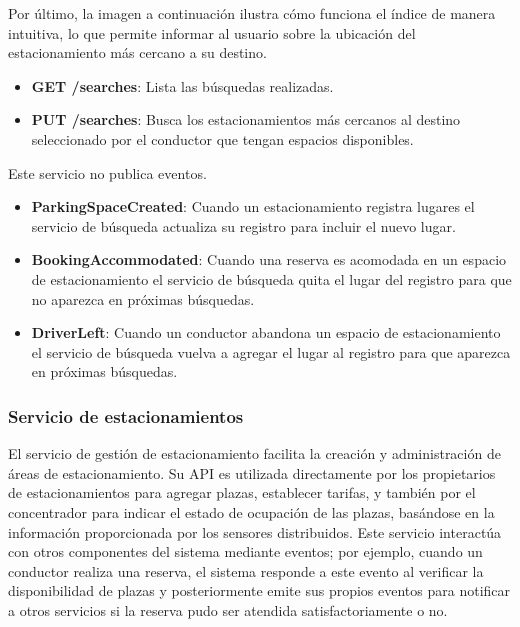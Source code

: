 
Por último, la imagen a continuación ilustra cómo funciona el índice de manera intuitiva, lo que permite informar al usuario sobre la ubicación del estacionamiento más cercano a su destino.


\begin{itemize}
    \item \textbf{GET /searches}: Lista las búsquedas realizadas.
    \item \textbf{PUT /searches}: Busca los estacionamientos más cercanos al destino seleccionado por el conductor que tengan espacios disponibles.
\end{itemize}

Este servicio no publica eventos.

\begin{itemize}
    \item \textbf{ParkingSpaceCreated}: Cuando un estacionamiento registra lugares el servicio de búsqueda actualiza su registro para incluir el nuevo lugar.
    \item \textbf{BookingAccommodated}: Cuando una reserva es acomodada en un espacio de estacionamiento el servicio de búsqueda quita el lugar del registro para que no aparezca en próximas búsquedas.
    \item \textbf{DriverLeft}: Cuando un conductor abandona un espacio de estacionamiento el servicio de búsqueda vuelva a agregar el lugar al registro para que aparezca en próximas búsquedas.
\end{itemize}



\subsubsection{Servicio de estacionamientos}
El servicio de gestión de estacionamiento facilita la creación y administración de áreas de estacionamiento. Su API es utilizada directamente por los propietarios de estacionamientos para agregar plazas, establecer tarifas, y también por el concentrador para indicar el estado de ocupación de las plazas, basándose en la información proporcionada por los sensores distribuidos. Este servicio interactúa con otros componentes del sistema mediante eventos; por ejemplo, cuando un conductor realiza una reserva, el sistema responde a este evento al verificar la disponibilidad de plazas y posteriormente emite sus propios eventos para notificar a otros servicios si la reserva pudo ser atendida satisfactoriamente o no.


